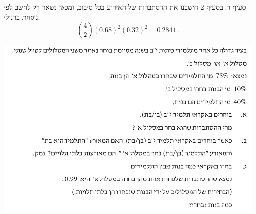 \documentclass[12pt,a4paper]{article}
\begin{document}
סעיף ד. בסעיף 2 חישבנו את ההסתברות של האירוע בכל סיבוב, ומכאן נשאר רק לחשב לפי נוסחת ברנולי:
\[
{4\choose 2}(0.68)^2 (0.32)^2= 0.2841\,.
\]


\newpage

\textbf{}

\begin{center}
\includegraphics[width=.95\textwidth]{summer-2014b-3}
\end{center}
\end{document}

